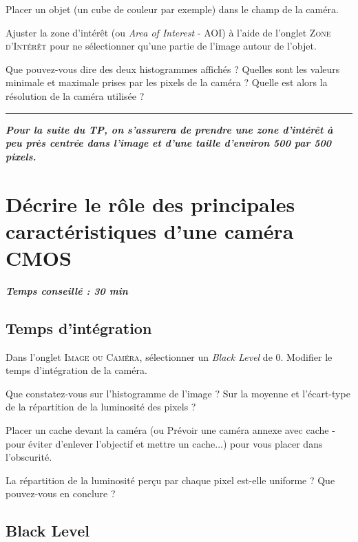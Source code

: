 \documentclass[a4paper,11pt,titlepage]{article} %
\begin{document}
\Manip Placer un objet (un cube de couleur par exemple) dans le champ de la caméra.

\Manip Ajuster la zone d'intérêt (ou \textit{Area of Interest} - AOI) à l'aide de l'onglet \textsc{Zone d'Intérêt} pour ne sélectionner qu'une partie de l'image autour de l'objet.

\Quest Que pouvez-vous dire des deux histogrammes affichés ? Quelles sont les valeurs minimale et maximale prises par les pixels de la caméra ? Quelle est alors la résolution de la caméra utilisée ?

\medskip


\noindent \rule{\linewidth}{1pt}

\textit{\textbf{Pour la suite du TP, on s'assurera de prendre une zone d'intérêt à peu près centrée dans l'image et d'une taille d'environ 500 par 500 pixels.}}


\newpage
\section{Décrire le rôle des principales caractéristiques d'une caméra CMOS}

\begin{center} \textbf{\textit{Temps conseillé : 30 min}} \end{center}


\subsection{Temps d'intégration}

\Manip Dans l'onglet \textsc{Image ou Caméra}, sélectionner un \textit{Black Level} de 0. Modifier le temps d'intégration de la caméra.

\Quest Que constatez-vous sur l'histogramme de l'image ? Sur la moyenne et l'écart-type de la répartition de la luminosité des pixels ?

\Manip Placer un cache devant la caméra (ou Prévoir une caméra annexe avec cache - pour éviter d'enlever l'objectif et mettre un cache...) pour vous placer dans l'obscurité.

\Quest La répartition de la luminosité perçu par chaque pixel est-elle uniforme ? Que pouvez-vous en conclure ?

\subsection{Black Level}
\end{document}
